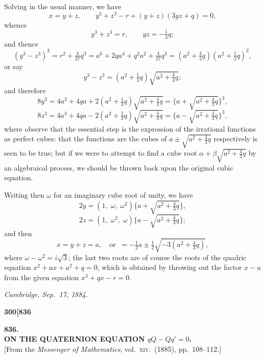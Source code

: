 \documentclass[11pt]{article}
\begin{document}
Solving in the usual manner, we have
\[
x = y + z,\qquad y^{3} + z^{3} - r + (y + z)(3yz + q) = 0,
\]
whence
\[
y^{3} + z^{3} = r,\qquad yz = -\tfrac{1}{3}q;
\]
and thence
\[
(y^{3} - z^{3})^{2} = r^{2} + \tfrac{4}{27}q^{3} = a^{6} + 2qa^{4} + q^{2}a^{2} + \tfrac{4}{27}q^{3} = (a^{2} + \tfrac{4}{3}q)(a^{2} + \tfrac{1}{3}q)^{2},
\]
or say
\[
y^{3} - z^{3} = (a^{2} + \tfrac{1}{3}q)\sqrt{a^{2} + \tfrac{4}{3}q};
\]
and therefore
\[
8y^{3} = 4a^{3} + 4qa + 2(a^{2} + \tfrac{1}{3}q)\sqrt{a^{2} + \tfrac{4}{3}q} = \bigl\{a + \sqrt{a^{2} + \tfrac{4}{3}q}\bigr\}^{3},
\]
\[
8z^{3} = 4a^{3} + 4qa - 2(a^{2} + \tfrac{1}{3}q)\sqrt{a^{2} + \tfrac{4}{3}q} = \bigl\{a - \sqrt{a^{2} + \tfrac{4}{3}q}\bigr\}^{3},
\]
where observe that the essential step is the expression of the irrational functions as perfect cubes: that the functions are the cubes of $a \pm \sqrt{a^{2} + \tfrac{4}{3}q}$ respectively is seen to be true; but if we were to attempt to find a cube root $\alpha + \beta\sqrt{a^{2} + \tfrac{4}{3}q}$ by an algebraical process, we should be thrown back upon the original cubic equation.

\medskip

Writing then $\omega$ for an imaginary cube root of unity, we have
\[
2y = (1,\;\omega,\;\omega^{2})\bigl\{a + \sqrt{a^{2} + \tfrac{4}{3}q}\bigr\},
\]
\[
2z = (1,\;\omega^{2},\;\omega)\bigl\{a - \sqrt{a^{2} + \tfrac{4}{3}q}\bigr\};
\]
and then
\[
x = y + z = a,\quad \text{or} \;\; = -\tfrac{1}{2}a \pm \tfrac{1}{2}\sqrt{-3(a^{2} + \tfrac{4}{3}q)},
\]
where $\omega - \omega^{2} = i\sqrt{3}$; the last two roots are of course the roots of the quadric equation $x^{2} + ax + a^{2} + q = 0$, which is obtained by throwing out the factor $x - a$ from the given equation $x^{3} + qx - r = 0$.

\medskip

\hfill \textit{Cambridge, Sep.\ 17, 1884.}


\newpage

\noindent\textbf{300}\hfill\hfill\textbf{[836}

\bigskip

\begin{center}
{\large\textbf{836.}}\\[0.7em]
{\large\textbf{ON THE QUATERNION EQUATION $qQ - Qq' = 0$.}}\\[1em]
{\small [From the \textit{Messenger of Mathematics}, vol.\ \textsc{xiv}.\ (1885), pp.\ 108--112.]}
\end{center}
\end{document}
